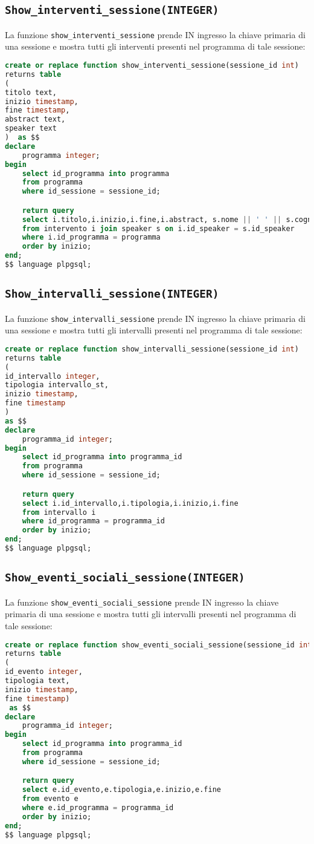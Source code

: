 \subsection{\texttt{Show\_interventi\_sessione(INTEGER)}}
La funzione \texttt{show\_interventi\_sessione} prende IN ingresso la chiave primaria di una sessione e mostra tutti gli interventi presenti nel programma di tale sessione:
\begin{lstlisting}[language=SQL,style=mystyle]
create or replace function show_interventi_sessione(sessione_id int)
returns table
(
titolo text,
inizio timestamp,
fine timestamp,
abstract text,
speaker text
)  as $$
declare 
    programma integer;
begin
    select id_programma into programma
    from programma
    where id_sessione = sessione_id;

    return query
    select i.titolo,i.inizio,i.fine,i.abstract, s.nome || ' ' || s.cognome as speaker
    from intervento i join speaker s on i.id_speaker = s.id_speaker
    where i.id_programma = programma
    order by inizio;
end;
$$ language plpgsql;
\end{lstlisting}

\subsection{\texttt{Show\_intervalli\_sessione(INTEGER)}}
La funzione \texttt{show\_intervalli\_sessione} prende IN ingresso la chiave primaria di una sessione e mostra tutti gli intervalli presenti nel programma di tale sessione:
\begin{lstlisting}[language=SQL,style=mystyle]
create or replace function show_intervalli_sessione(sessione_id int)
returns table
(
id_intervallo integer,
tipologia intervallo_st,
inizio timestamp,
fine timestamp
)  
as $$
declare 
    programma_id integer;
begin
    select id_programma into programma_id
    from programma
    where id_sessione = sessione_id;

    return query
    select i.id_intervallo,i.tipologia,i.inizio,i.fine
    from intervallo i
    where id_programma = programma_id
    order by inizio;
end;
$$ language plpgsql;
\end{lstlisting}
\subsection{\texttt{Show\_eventi\_sociali\_sessione(INTEGER)}}
La funzione \texttt{show\_eventi\_sociali\_sessione} prende IN ingresso la chiave primaria di una sessione e mostra tutti gli intervalli presenti nel programma di tale sessione:
\begin{lstlisting}[language=SQL,style=mystyle]
create or replace function show_eventi_sociali_sessione(sessione_id int)
returns table
(
id_evento integer,
tipologia text,
inizio timestamp,
fine timestamp) 
 as $$
declare 
    programma_id integer;
begin
    select id_programma into programma_id
    from programma
    where id_sessione = sessione_id;

    return query
    select e.id_evento,e.tipologia,e.inizio,e.fine
    from evento e
    where e.id_programma = programma_id
    order by inizio;
end;
$$ language plpgsql;
\end{lstlisting}
